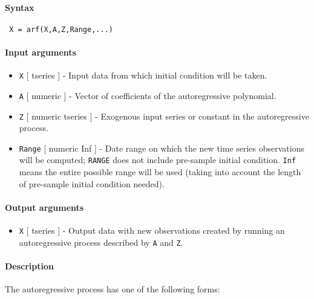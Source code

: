 


	\paragraph{Syntax}
 
 \begin{verbatim}
 X = arf(X,A,Z,Range,...)
 \end{verbatim}
 
 \paragraph{Input arguments}
 
 \begin{itemize}
 \item
   \texttt{X} {[} tseries {]} - Input data from which initial condition
   will be taken.
 \item
   \texttt{A} {[} numeric {]} - Vector of coefficients of the
   autoregressive polynomial.
 \item
   \texttt{Z} {[} numeric \textbar{} tseries {]} - Exogenous input series
   or constant in the autoregressive process.
 \item
   \texttt{Range} {[} numeric \textbar{} Inf {]} - Date range on which
   the new time series observations will be computed; \texttt{RANGE} does
   not include pre-sample initial condition. \texttt{Inf} means the
   entire possible range will be used (taking into account the length of
   pre-sample initial condition needed).
 \end{itemize}
 
 \paragraph{Output arguments}
 
 \begin{itemize}
 \item
   \texttt{X} {[} tseries {]} - Output data with new observations created
   by running an autoregressive process described by \texttt{A} and
   \texttt{Z}.
 \end{itemize}
 
 \paragraph{Description}
 
 The autoregressive process has one of the following forms:
 
